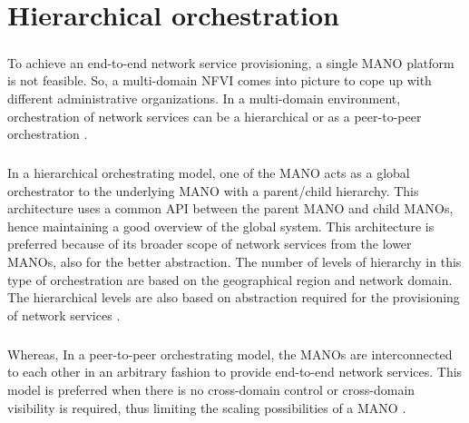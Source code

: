 \chapter{Hierarchical orchestration}
\label{ch:Hierarchical Orchestration}

\paragraph{} To achieve an end-to-end network service provisioning, a single MANO platform is not feasible. So, a multi-domain NFVI comes into picture to cope up with different administrative organizations. In a multi-domain environment, orchestration of network services can be a hierarchical or as a peer-to-peer orchestration \cite{munoz2018hierarchical}.

\paragraph{} In a hierarchical orchestrating model, one of the MANO acts as a global orchestrator to the underlying MANO with a parent/child hierarchy. This architecture uses a common API between the parent MANO and child MANOs, hence maintaining a good overview of the global system. This architecture is preferred because of its broader scope of network services from the lower MANOs, also for the better abstraction. The number of levels of hierarchy in this type of orchestration are based on the geographical region and network domain. The hierarchical levels are also based on abstraction required for the provisioning of network services \cite{munoz2018hierarchical}.


\paragraph{}Whereas, In a peer-to-peer orchestrating model, the MANOs are interconnected to each other in an arbitrary fashion to provide end-to-end network services. This model is preferred when there is no cross-domain control or cross-domain visibility is required, thus limiting the scaling possibilities of a MANO \cite{munoz2018hierarchical}.

 